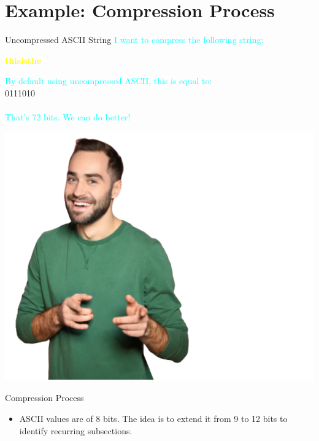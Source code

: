 \documentclass{beamer}
\begin{document}
\section{Example: Compression Process}
\begin{frame}{Uncompressed ASCII String}
        \textcolor{cyan}{
        I want to compress the following string: \\
    }
    \textcolor{yellow}{
        \begin{center}
             \textbf{\large thisisthe} \\  
        \end{center}
    }
    \textcolor{cyan}{
        By default using uncompressed ASCII, this is equal to: \\
    }
        0111010         \\
         \quad{} \quad\quad{} \quad\quad{} \quad\quad{} \quad{} \quad\quad{} \quad\quad{} \quad{}\\
    \textcolor{cyan}{That's 72 bits. We can do better!}\\
    \begin{center}
        \includegraphics[scale=0.2]{assets/motivated.png}
    \end{center}
\end{frame}
\begin{frame}{Compression Process}
    \begin{itemize}[label=]
    \color{olive}
        \item ASCII values are of 8 bits. The idea is to extend it from 9 to 12 bits to identify recurring subsections. 
    \end{itemize}
\end{frame}
\end{document}
